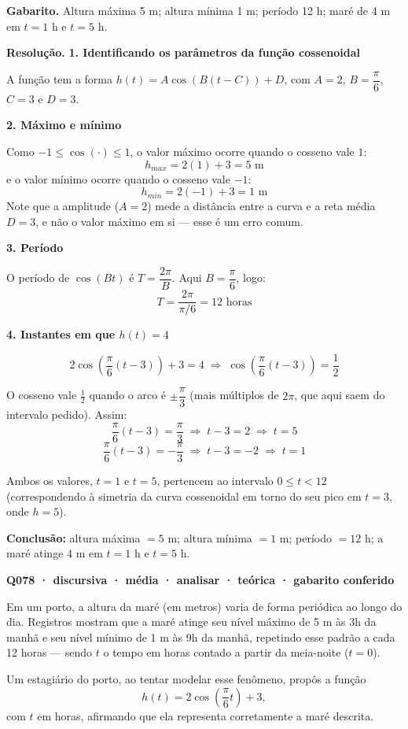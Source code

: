 \documentclass[11pt,a4paper]{article}
\begin{document}
\textbf{Gabarito.} Altura máxima 5 m; altura mínima 1 m; período 12 h; maré de 4 m em $t=1$ h e $t=5$ h.

\textbf{Resolução.} \textbf{1. Identificando os parâmetros da função cossenoidal}

A função tem a forma $h(t) = A\cos(B(t-C)) + D$, com $A=2$, $B=\dfrac{\pi}{6}$, $C=3$ e $D=3$.

\textbf{2. Máximo e mínimo}

Como $-1 \le \cos(\cdot) \le 1$, o valor máximo ocorre quando o cosseno vale $1$:
$$h_{max} = 2(1) + 3 = 5 \text{ m}$$
e o valor mínimo ocorre quando o cosseno vale $-1$:
$$h_{min} = 2(-1) + 3 = 1 \text{ m}$$
Note que a amplitude ($A=2$) mede a distância entre a curva e a reta média $D=3$, e não o valor máximo em si — esse é um erro comum.

\textbf{3. Período}

O período de $\cos(Bt)$ é $T = \dfrac{2\pi}{B}$. Aqui $B = \dfrac{\pi}{6}$, logo:
$$T = \frac{2\pi}{\pi/6} = 12 \text{ horas}$$

\textbf{4. Instantes em que $h(t) = 4$}

$$2\cos\left(\frac{\pi}{6}(t-3)\right) + 3 = 4 \;\Rightarrow\; \cos\left(\frac{\pi}{6}(t-3)\right) = \frac{1}{2}$$

O cosseno vale $\tfrac{1}{2}$ quando o arco é $\pm\dfrac{\pi}{3}$ (mais múltiplos de $2\pi$, que aqui saem do intervalo pedido). Assim:
$$\frac{\pi}{6}(t-3) = \frac{\pi}{3} \;\Rightarrow\; t-3 = 2 \;\Rightarrow\; t = 5$$
$$\frac{\pi}{6}(t-3) = -\frac{\pi}{3} \;\Rightarrow\; t-3 = -2 \;\Rightarrow\; t = 1$$

Ambos os valores, $t=1$ e $t=5$, pertencem ao intervalo $0 \le t < 12$ (correspondendo à simetria da curva cossenoidal em torno do seu pico em $t=3$, onde $h=5$).

\textbf{Conclusão:} altura máxima $=5$ m; altura mínima $=1$ m; período $=12$ h; a maré atinge 4 m em $t=1$ h e $t=5$ h.

\bigskip\noindent\textbf{Q078 · discursiva · média · analisar · teórica · gabarito conferido}\par\nopagebreak
Em um porto, a altura da maré (em metros) varia de forma periódica ao longo do dia. Registros mostram que a maré atinge seu nível máximo de 5 m às 3h da manhã e seu nível mínimo de 1 m às 9h da manhã, repetindo esse padrão a cada 12 horas — sendo $t$ o tempo em horas contado a partir da meia-noite ($t=0$).

Um estagiário do porto, ao tentar modelar esse fenômeno, propôs a função
$$h(t) = 2\cos\left(\frac{\pi}{6}t\right) + 3,$$
com $t$ em horas, afirmando que ela representa corretamente a maré descrita.
\end{document}
